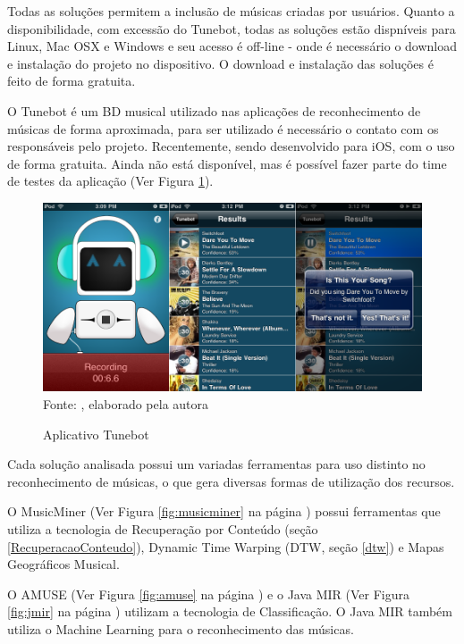 Todas as soluções permitem a inclusão de músicas criadas por usuários. Quanto a disponibilidade, com excessão do Tunebot, todas as soluções estão dispníveis para Linux, Mac OSX e Windows e seu acesso é off-line - onde é necessário o download e instalação do projeto no dispositivo. O download e instalação das soluções é feito de forma gratuita.

O Tunebot é um BD musical utilizado nas aplicações de reconhecimento de músicas de forma aproximada, para ser utilizado é necessário o contato com os responsáveis pelo projeto. Recentemente, sendo desenvolvido para iOS, com o uso de forma gratuita. Ainda não está disponível, mas é possível fazer parte do time de testes da aplicação (Ver Figura \ref{fig:tunebotIphone}).

\begin{figure}[!htb]
   \centering
   \caption{Aplicativo Tunebot}\label{fig:tunebotIphone} 
   \includegraphics[scale=0.40]{figuras/tunebot-iphone.png}
   \\Fonte: \cite{tunebotiOS}, elaborado pela autora
\end{figure}

Cada solução analisada possui um variadas ferramentas para uso distinto no reconhecimento de músicas, o que gera diversas formas de utilização dos recursos.

O MusicMiner (Ver Figura \ref{fig:musicminer} na página \pageref{fig:musicminer}) possui ferramentas que utiliza a tecnologia de Recuperação por Conteúdo (seção \ref{RecuperacaoConteudo}), Dynamic Time Warping (DTW, seção \ref{dtw}) e Mapas Geográficos Musical.

O AMUSE (Ver Figura \ref{fig:amuse} na página \pageref{fig:amuse}) e o Java MIR (Ver Figura \ref{fig:jmir} na página \pageref{fig:jmir}) utilizam a tecnologia de Classificação. O Java MIR também utiliza o Machine Learning para o reconhecimento das músicas.

